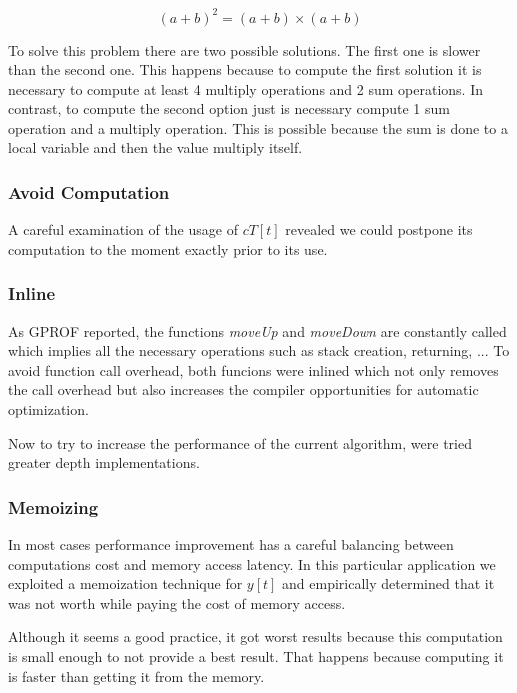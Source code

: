 \documentclass[conference]{IEEEtran}
\begin{document}
\begin{equation}
(a + b)^2 = (a + b) \times (a + b)
\end{equation}

To solve this problem there are two possible solutions. The first one is slower than the second one. This happens because to compute the first solution it is necessary to compute at least 4 multiply operations and 2 sum operations. In contrast, to compute the second option just is necessary compute 1 sum operation and a multiply operation. This is possible because the sum is done to a local variable and then the value multiply itself. 

\subsubsection{Avoid Computation}
A careful examination of the usage of $cT[t]$ revealed we could postpone its computation to the moment exactly prior to its use. 

\subsubsection{Inline}
As GPROF reported, the functions \emph{moveUp} and \emph{moveDown} are constantly called which implies all the necessary operations such as stack creation, returning, ... To avoid function call overhead, both funcions were inlined which not only removes the call overhead but also increases the compiler opportunities for automatic optimization.

    Now to try to increase the performance of the current algorithm, were tried greater depth implementations.
    
\subsubsection{Memoizing}
In most cases performance improvement has a careful balancing between computations cost and memory access latency. In this particular application we exploited a memoization technique for $y[t]$ and empirically determined that it was not worth while paying the cost of memory access.

    Although it seems a good practice, it got worst results because this computation is small enough to not provide a best result. That happens because computing it is faster than getting it from the memory.
    
\end{document}
